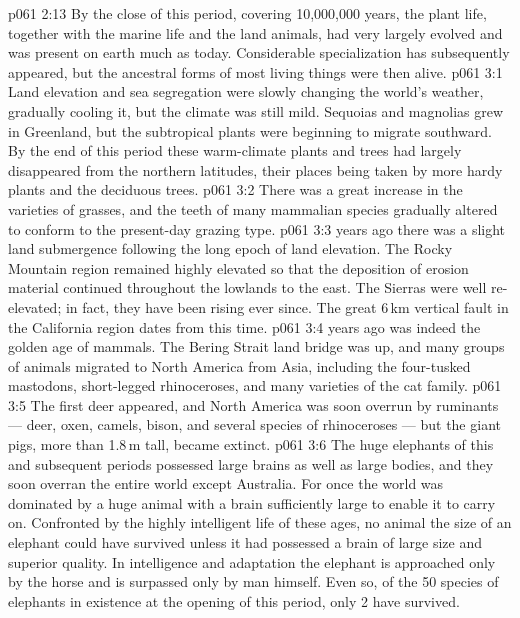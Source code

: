 \vs p061 2:13 \pc By the close of this  period, covering 10,000,000 years, the plant life, together with the marine life and the land animals, had very largely evolved and was present on earth much as today. Considerable specialization has subsequently appeared, but the ancestral forms of most living things were then alive.
\vs p061 3:1 Land elevation and sea segregation were slowly changing the world’s weather, gradually cooling it, but the climate was still mild. Sequoias and magnolias grew in Greenland, but the subtropical plants were beginning to migrate southward. By the end of this period these warm\hyp{}climate plants and trees had largely disappeared from the northern latitudes, their places being taken by more hardy plants and the deciduous trees.
\vs p061 3:2 There was a great increase in the varieties of grasses, and the teeth of many mammalian species gradually altered to conform to the present\hyp{}day grazing type.
\vs p061 3:3 \pc {} years ago there was a slight land submergence following the long epoch of land elevation. The Rocky Mountain region remained highly elevated so that the deposition of erosion material continued throughout the lowlands to the east. The Sierras were well re\hyp{}elevated; in fact, they have been rising ever since. The great 6\,km vertical fault in the California region dates from this time.
\vs p061 3:4 \pc {} years ago was indeed the golden age of mammals. The Bering Strait land bridge was up, and many groups of animals migrated to North America from Asia, including the four\hyp{}tusked mastodons, short\hyp{}legged rhinoceroses, and many varieties of the cat family.
\vs p061 3:5 The first deer appeared, and North America was soon overrun by ruminants --- deer, oxen, camels, bison, and several species of rhinoceroses --- but the giant pigs, more than 1.8\,m tall, became extinct.
\vs p061 3:6 The huge elephants of this and subsequent periods possessed large brains as well as large bodies, and they soon overran the entire world except Australia. For once the world was dominated by a huge animal with a brain sufficiently large to enable it to carry on. Confronted by the highly intelligent life of these ages, no animal the size of an elephant could have survived unless it had possessed a brain of large size and superior quality. In intelligence and adaptation the elephant is approached only by the horse and is surpassed only by man himself. Even so, of the 50 species of elephants in existence at the opening of this period, only 2 have survived.
